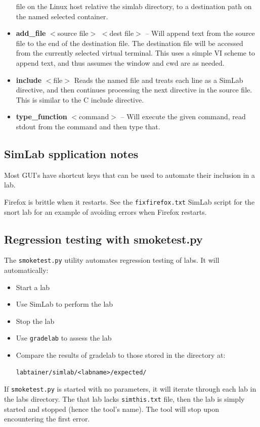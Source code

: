 \documentclass[12pt]{article}
\begin{document}
\begin{itemize}
file on the Linux host relative the simlab directory, to a destination path on the named selected container.  
\item \textbf{add\_file} $<$source file$>$ $<$dest file$>$ -- Will append text from the source file to the 
end of the destination file.  The destination file will be accessed from the currently selected virtual
terminal.  This uses a simple VI scheme to append text, and thus assumes the window and cwd are as needed.
\item \textbf{include} $<$file$>$ Reads the named file and treats each line as a SimLab directive,
and then continues processing the next directive in the source file.  This is similar to the C
include directive.
\item \textbf{type\_function} $<$command$>$ -- Will execute the given command, read stdout from the 
command and then type that.

\end{itemize}
\subsection{SimLab spplication notes}
\label{simlab_notes}
Most GUI's have shortcut keys that can be used to automate their inclusion in a lab.

Firefox is brittle when it restarts.  See the {\tt fixfirefox.txt} SimLab script for the snort lab
for an example of avoiding errors when Firefox restarts.

\subsection{Regression testing with smoketest.py} \label{smoketest}
The {\tt smoketest.py} utility automates regression testing of labs.  It will automatically:
\begin{itemize}
\item Start a lab
\item Use SimLab to perform the lab
\item Stop the lab
\item Use {\tt gradelab} to assess the lab
\item Compare the results of gradelab to those stored in the directory at:
\begin{verbatim}
labtainer/simlab/<labname>/expected/
\end{verbatim}
\end{itemize}
If {\tt smoketest.py} is started with no parameters, it will iterate through each lab in the labs
directory.  The that lab lacks {\tt simthis.txt} file, then the lab is simply started and stopped
(hence the tool's name).  The tool will stop upon encountering the first error.
\end{document}
